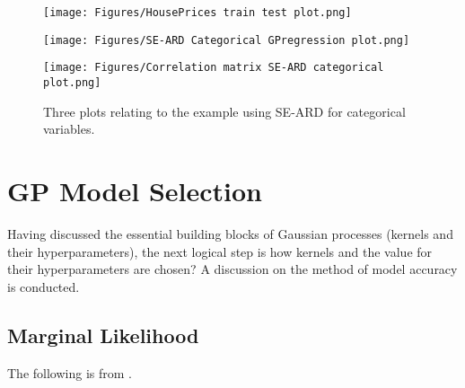 \documentclass[12pt,a4paper]{article}
\begin{document}
\begin{figure}[h]
    \centering

    \begin{minipage}{0.48\textwidth}
        \centering
        \texttt{[image: Figures/HousePrices train test plot.png]} %
        \label{fig:HousePrices train test plot}
    \end{minipage} 
    \begin{minipage}{0.48\textwidth}
        \centering
        \texttt{[image: Figures/SE-ARD Categorical GPregression plot.png]} %
        \label{fig:SE-ARD Categorical GPregression plot}
    \end{minipage}
    \begin{minipage}{0.45\textwidth}
        \centering
        \texttt{[image: Figures/Correlation matrix SE-ARD categorical plot.png]} %
        \label{fig:Correlation matrix SE-ARD categorical plot}
    \end{minipage}
    \caption{Three plots relating to the example using SE-ARD for categorical variables.}
    \label{fig:SE-ARD categorical plots}
\end{figure}

\clearpage
\section{GP Model Selection}
\label{sec:GP Model Selection}
Having discussed the essential building blocks of Gaussian processes (kernels and their hyperparameters), the next logical step is how kernels and the value for their hyperparameters are chosen? A discussion on the method of model accuracy is conducted.

\subsection{Marginal Likelihood}
\label{sec:Marginal Likelihood}

The following is from \citet{williams2006gaussian}.
\end{document}
